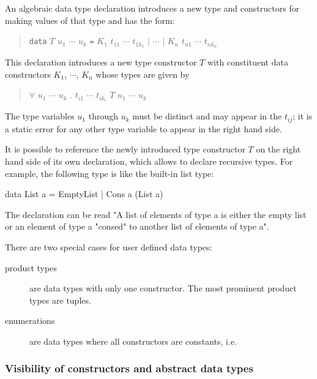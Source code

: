 An algebraic data type declaration introduces a new type and constructors for making values of that type and has the form:
\begin{quote}
\texttt{data} $T$ $u_1$ $\cdots$ $u_k$ \texttt{=} $K_1$ $t_{11}$ $\cdots$ $t_{1k_1}$ $|$ $\cdots$ $|$ $K_n$ $t_{n1}$ $\cdots$ $t_{nk_n}$
\end{quote}

This declaration introduces a new type constructor $T$ with constituent data constructors $K_1$, $\cdots$, $K_n$ whose types are given by
\begin{quote}
$\forall$ $u_1$ $\cdots$ $u_k$ . $t_{i1}$ \arrow{} $\cdots$ \arrow{} $t_{ik_i}$ \arrow{} $T$ $u_1$ $\cdots$ $u_k$
\end{quote}

The type variables $u_1$ through $u_k$ must be distinct and may appear in the $t_{ij}$; it is a static error for any other type variable to appear in the right hand side.

It is possible to reference the newly introduced type constructor $T$ on the right hand side of its own declaration, which allows to declare recursive types. For example, the following type is like the built-in list type:

\begin{code}
data List a = EmptyList | Cons a (List a)
\end{code}

The declaration can be read "A list of elements of type a is either the empty list or an element of type a "consed" to another list of elements of type a".

There are two special cases for user defined data types:
\begin{description}
\item [product types] are data types with only one constructor. The most prominent product types are tuples.
\item [enumerations] are data types where all constructors are constants, i.e. 
\end{description}

\subsubsection{Visibility of constructors and abstract data types}


